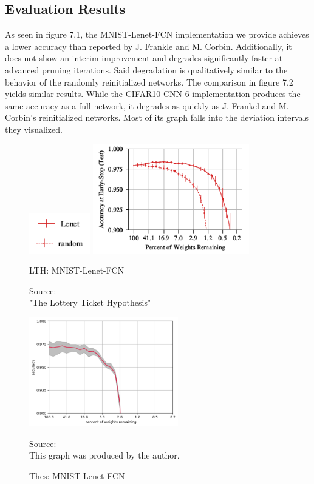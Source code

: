\subsection*{Evaluation Results}
As seen in figure 7.1, the MNIST-Lenet-FCN implementation we provide achieves a lower accuracy than reported by J. Frankle and M. Corbin. Additionally, it does not show an interim improvement and degrades significantly faster at advanced pruning iterations. Said degradation is qualitatively similar to the behavior of the randomly reinitialized networks.
The comparison in figure 7.2 yields similar results. While the CIFAR10-CNN-6 implementation produces the same accuracy as a full network, it degrades as quickly as J. Frankel and M. Corbin's reinitialized networks. Most of its graph falls into the deviation intervals they visualized.

\begin{figure}
	\begin{minipage}{\textwidth}
		\centering
		\includegraphics[width=100px]{gfx/7-Evaluation/LTH_3_legend.png}
	\end{minipage}
	\begin{minipage}{0.5\textwidth}
		\centering
		\includegraphics[height=180px]{gfx/7-Evaluation/LTH_0.png}
		\caption{LTH: MNIST-Lenet-FCN}
		\vspace{7pt}
		\footnotesize{
			Source:\\
			"The Lottery Ticket Hypothesis" \cite{LTH}
		}
		\label{fig:MNIST-Lenet-FCN-LTH}
	\end{minipage}\hfill
	\begin{minipage}{0.5\textwidth}
		\centering
		\includegraphics[height=180px]{gfx/Experiments/Reproduction-MNIST-FCN/accuracy/converged.png}
		\caption{Thes: MNIST-Lenet-FCN}
		\vspace{7pt}
		\footnotesize{
			Source:\\
			This graph was produced by the author.
		}
		\label{fig:MNIST-Lenet-FCN-Thesis}
	\end{minipage}
\end{figure}

